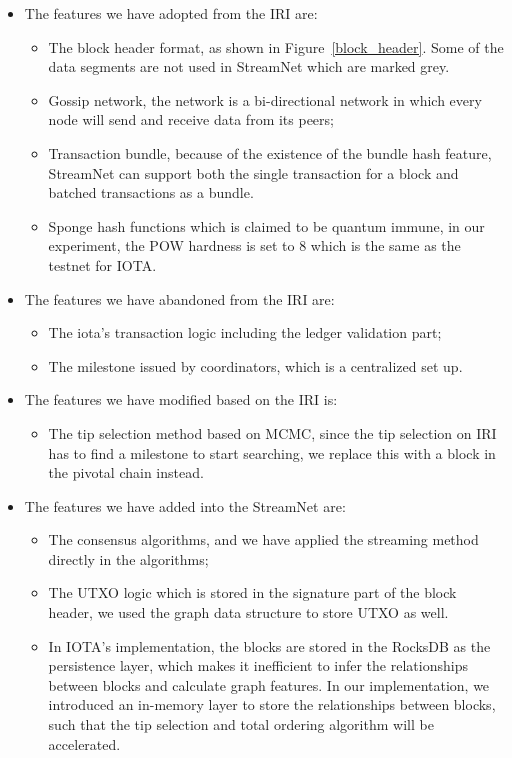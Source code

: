 \begin{itemize}
    \item The features we have adopted from the IRI are: 
    \begin{itemize}
        \item The block header format, as shown in Figure~\ref{block_header}. Some of the data segments are not used in StreamNet which are marked grey.
        \item Gossip network, the network is a bi-directional network in which every node will send and receive data from its peers;
        \item Transaction bundle, because of the existence of the bundle hash feature, StreamNet can support both the single transaction for a block and batched transactions as a bundle. 
        \item Sponge hash functions which is claimed to be quantum immune, in our experiment, the POW hardness is set to 8 which is the same as the testnet for IOTA.
    \end{itemize}

    \item The features we have abandoned from the IRI are:
    \begin{itemize}
        \item The iota's transaction logic including the ledger validation part;
        \item The milestone issued by coordinators, which is a centralized set up. 
    \end{itemize}

    \item The features we have modified based on the IRI is: 
    \begin{itemize}
        \item The tip selection method based on MCMC, since the tip selection on IRI has to find a milestone to start searching, we replace this with a block in the pivotal chain instead.
    \end{itemize}


    \item The features we have added into the StreamNet are: 
    \begin{itemize}
        \item The consensus algorithms, and we have applied the streaming method directly in the algorithms; 
        \item The UTXO logic which is stored in the signature part of the block header, we used the graph data structure to store UTXO as well. 
        \item In IOTA's implementation, the blocks are stored in the RocksDB \cite{RocksDB} as the persistence layer, which makes it inefficient to infer the relationships between blocks and calculate graph features. In our implementation, we introduced an in-memory layer to store the relationships between blocks, such that the tip selection and total ordering algorithm will be accelerated. 
    \end{itemize}
\end{itemize}

